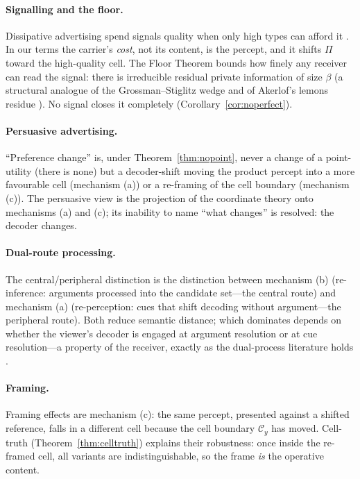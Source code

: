 \documentclass[twocolumn,11pt,a4paper]{article}
\theoremstyle{adv}
\theoremstyle{definition}
\theoremstyle{remark}
\newcommand{\Cell}{\mathcal{C}}        %
\newcommand{\Proj}{\Pi}                %
\newcommand{\floor}{\beta}            %
\begin{document}
\paragraph{Signalling and the floor.}
Dissipative advertising spend signals quality when only high types can
afford it \citep{spence1973,milgrom1986}. In our terms the carrier's
\emph{cost}, not its content, is the percept, and it shifts $\Proj$ toward
the high-quality cell. The Floor Theorem bounds how finely any receiver can
read the signal: there is irreducible residual private information of size
$\floor$ (a structural analogue of the Grossman--Stiglitz wedge
\citep{grossman1980} and of Akerlof's lemons residue \citep{akerlof1970}).
No signal closes it completely (Corollary~\ref{cor:noperfect}).

\paragraph{Persuasive advertising.}
``Preference change'' is, under Theorem~\ref{thm:nopoint}, never a change
of a point-utility (there is none) but a decoder-shift moving the product
percept into a more favourable cell (mechanism (a)) or a re-framing of the
cell boundary (mechanism (c)). The persuasive view \citep{dixit1978,
bagwell2007} is the projection of the coordinate theory onto
mechanisms (a) and (c); its inability to name ``what changes'' is resolved:
the decoder changes.

\paragraph{Dual-route processing.}
The central/peripheral distinction \citep{petty1983} is the distinction
between mechanism (b) (re-inference: arguments processed into the candidate
set---the central route) and mechanism (a) (re-perception: cues that shift
decoding without argument---the peripheral route). Both reduce semantic
distance; which dominates depends on whether the viewer's decoder is
engaged at argument resolution or at cue resolution---a property of the
receiver, exactly as the dual-process literature holds \citep{kahneman2011}.

\paragraph{Framing.}
Framing effects \citep{tversky1981} are mechanism (c): the same percept,
presented against a shifted reference, falls in a different cell because
the cell boundary $\Cell_y$ has moved. Cell-truth
(Theorem~\ref{thm:celltruth}) explains their robustness: once inside the
re-framed cell, all variants are indistinguishable, so the frame
\emph{is} the operative content.
\end{document}
